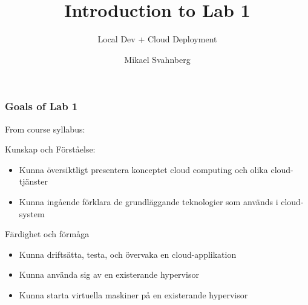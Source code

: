 \documentclass[10pt]{beamer}
\title[]{Introduction to Lab 1}
\subtitle{Local Dev + Cloud Deployment}
\author[Mikael Svahnberg]{Mikael Svahnberg\inst{1}}
\institute[BTH] %
{
  \inst{1}%
 Mikael.Svahnberg@bth.se\\
 School of Computing\\
 Blekinge Institute of Technology%
}
\begin{document}
\begin{frame}
  \titlepage
\end{frame}



\begin{frame}[t]
\frametitle{Goals of Lab 1}

From course syllabus:

Kunskap och Förståelse:
\begin{itemize}
\item Kunna översiktligt presentera konceptet cloud computing och olika cloud-tjänster
\item Kunna ingående förklara de grundläggande teknologier som används i cloud-system
\end{itemize}

Färdighet och förmåga
\begin{itemize}
\item Kunna driftsätta, testa, och övervaka en cloud-applikation
\item Kunna använda sig av en existerande hypervisor
\item Kunna starta virtuella maskiner på en existerande hypervisor
\end{itemize}

\end{frame}
\end{document}
